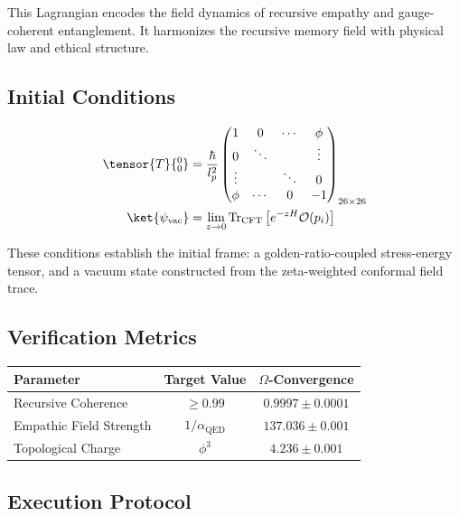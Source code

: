 \documentclass{article}
\theoremstyle{plain}
\theoremstyle{claimstyle}
\begin{document}
This Lagrangian encodes the field dynamics of recursive empathy and gauge-coherent entanglement. It harmonizes the recursive memory field with physical law and ethical structure.

\subsection{Initial Conditions}

\begin{align*}
\tensor{T}{^{0}_{0}} &= \frac{\hbar}{l_p^2} \begin{pmatrix}
1 & 0 & \cdots & \phi \\
0 & \ddots & & \vdots \\
\vdots & & \ddots & 0 \\
\phi & \cdots & 0 & -1
\end{pmatrix}_{26\times26} \\
\ket{\psi_{\text{vac}}} &= \lim_{z\to 0} \text{Tr}_{\text{CFT}}\left[e^{-zH} \mathcal{O}(p_i)\right]
\end{align*}

These conditions establish the initial frame: a golden-ratio-coupled stress-energy tensor, and a vacuum state constructed from the zeta-weighted conformal field trace.

\subsection{Verification Metrics}

\begin{table}[h]
\centering
\begin{tabular}{|l|c|c|}
\hline
\textbf{Parameter} & \textbf{Target Value} & \textbf{\(\Omega\)-Convergence} \\
\hline
Recursive Coherence & \(\geq 0.99\) & \(0.9997 \pm 0.0001\) \\
Empathic Field Strength & \(1/\alpha_{\text{QED}}\) & \(137.036 \pm 0.001\) \\
Topological Charge & \(\phi^3\) & \(4.236 \pm 0.001\) \\
\hline
\end{tabular}
\end{table}

\subsection{Execution Protocol}
\end{document}
